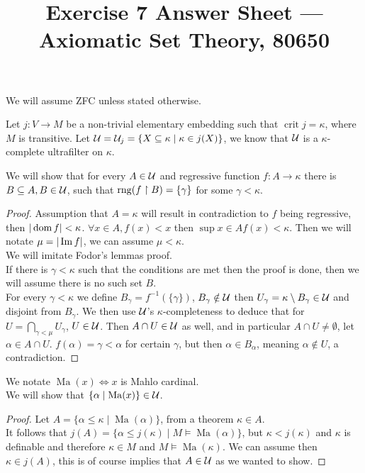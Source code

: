 
\title{Exercise 7 Answer Sheet --- Axiomatic Set Theory, 80650}

\DeclareMathOperator{\crit}{crit}


\maketitle
\maketitleprint{}

\question{}
We will assume ZFC unless stated otherwise.

Let $j : V \to M$ be a non-trivial elementary embedding such that $\crit j = \kappa$, where $M$ is transitive.
Let $\mathcal{U} = \mathcal{U}_j = \{ X \subseteq \kappa \mid \kappa \in j(X) \}$, we know that $\mathcal{U}$ is a $\kappa$-complete ultrafilter on $\kappa$.

\subquestion{}
We will show that for every $A \in \mathcal{U}$ and regressive function $f : A \to \kappa$ there is $B \subseteq A, B \in \mathcal{U}$, such that $\operatorname{rng}(f \restriction B) = \{ \gamma \}$ for some $\gamma < \kappa$.
\begin{proof}
	Assumption that $A = \kappa$ will result in contradiction to $f$ being regressive, then $|\operatorname{dom} f| < \kappa$.
	$\forall x \in A, f(x) < x$ then $\sup{x \in A} f(x) < \kappa$. Then we will notate $\mu = |\operatorname{Im} f|$, we can assume $\mu < \kappa$. \\
	We will imitate Fodor's lemmas proof. \\
	If there is $\gamma < \kappa$ such that the conditions are met then the proof is done, then we will assume there is no such set $B$. \\
	For every $\gamma < \kappa$ we define $B_\gamma = f^{-1}(\{\gamma\})$, $B_\gamma \notin \mathcal{U}$ then $U_\gamma = \kappa \setminus B_\gamma \in \mathcal{U}$ and disjoint from $B_\gamma$.
	We then use $\mathcal{U}$'s $\kappa$-completeness to deduce that for $U = \bigcap_{\gamma < \mu} U_\gamma$, $U \in \mathcal{U}$.
	Then $A \cap U \in \mathcal{U}$ as well, and in particular $A \cap U \ne \emptyset$, let $\alpha \in A \cap U$.
	$f(\alpha) = \gamma < \alpha$ for certain $\gamma$, but then $\alpha \in B_\alpha$, meaning $\alpha \notin U$, a contradiction.
\end{proof}

\subquestion{}
We notate $\operatorname{Ma}(x) \iff x$ is Mahlo cardinal. \\
We will show that $\{ \alpha \mid \operatorname{Ma}(x) \} \in \mathcal{U}$.
\begin{proof}
	Let $A = \{\alpha \le \kappa \mid \operatorname{Ma}(\alpha) \}$, from a theorem $\kappa \in A$. \\
	It follows that $j(A) = \{ \alpha \le j(\kappa) \mid M \models \operatorname{Ma}(\alpha) \}$, but $\kappa < j(\kappa)$ and $\kappa$ is definable and therefore $\kappa \in M$ and $M \models \operatorname{Ma}(\kappa)$.
	We can assume then $\kappa \in j(A)$, this is of course implies that $A \in \mathcal{U}$ as we wanted to show.
\end{proof}

